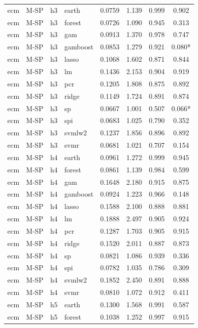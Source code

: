 \begin{ThreePartTable}
\begin{longtable}[t]{llclcccc}
\addlinespace
ecm & M-SP & h3 & earth & 0.0759 & 1.139 & 0.999 & 0.902\\
ecm & M-SP & h3 & forest & 0.0726 & 1.090 & 0.945 & 0.313\\
ecm & M-SP & h3 & gam & 0.0913 & 1.370 & 0.978 & 0.747\\
ecm & M-SP & h3 & gamboost & 0.0853 & 1.279 & 0.921 & 0.080*\\
ecm & M-SP & h3 & lasso & 0.1068 & 1.602 & 0.871 & 0.844\\
ecm & M-SP & h3 & lm & 0.1436 & 2.153 & 0.904 & 0.919\\
ecm & M-SP & h3 & pcr & 0.1205 & 1.808 & 0.875 & 0.892\\
ecm & M-SP & h3 & ridge & 0.1149 & 1.724 & 0.891 & 0.874\\
ecm & M-SP & h3 & sp & 0.0667 & 1.001 & 0.507 & 0.066*\\
ecm & M-SP & h3 & spi & 0.0683 & 1.025 & 0.790 & 0.352\\
ecm & M-SP & h3 & svmlw2 & 0.1237 & 1.856 & 0.896 & 0.892\\
ecm & M-SP & h3 & svmr & 0.0681 & 1.021 & 0.707 & 0.154\\
\addlinespace
ecm & M-SP & h4 & earth & 0.0961 & 1.272 & 0.999 & 0.945\\
ecm & M-SP & h4 & forest & 0.0861 & 1.139 & 0.984 & 0.599\\
ecm & M-SP & h4 & gam & 0.1648 & 2.180 & 0.915 & 0.875\\
ecm & M-SP & h4 & gamboost & 0.0924 & 1.223 & 0.966 & 0.148\\
ecm & M-SP & h4 & lasso & 0.1588 & 2.100 & 0.888 & 0.881\\
ecm & M-SP & h4 & lm & 0.1888 & 2.497 & 0.905 & 0.924\\
ecm & M-SP & h4 & pcr & 0.1287 & 1.703 & 0.905 & 0.915\\
ecm & M-SP & h4 & ridge & 0.1520 & 2.011 & 0.887 & 0.873\\
ecm & M-SP & h4 & sp & 0.0821 & 1.086 & 0.939 & 0.336\\
ecm & M-SP & h4 & spi & 0.0782 & 1.035 & 0.786 & 0.309\\
ecm & M-SP & h4 & svmlw2 & 0.1852 & 2.450 & 0.891 & 0.888\\
ecm & M-SP & h4 & svmr & 0.0810 & 1.072 & 0.912 & 0.411\\
\addlinespace
ecm & M-SP & h5 & earth & 0.1300 & 1.568 & 0.991 & 0.587\\
ecm & M-SP & h5 & forest & 0.1038 & 1.252 & 0.997 & 0.915\\

\end{longtable}
\end{ThreePartTable}
